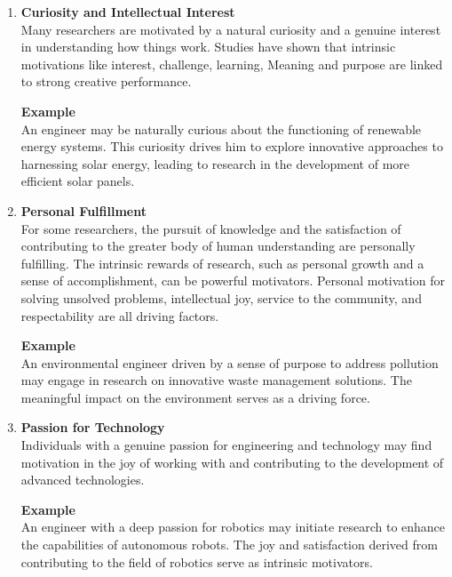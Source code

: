 \documentclass{article}
\begin{document}
	\begin{enumerate}[label=\textbf{\roman*)}]
		\item \textbf{Curiosity and Intellectual Interest} \\
		Many researchers are motivated by a natural curiosity and a genuine interest in understanding how
		things work.
		Studies have shown that intrinsic motivations like interest, challenge, learning, Meaning and purpose
		are linked to strong creative performance.

		\textbf{Example} \\
		An engineer may be naturally curious about the functioning of renewable energy systems.
		This curiosity drives him to explore innovative approaches to harnessing solar energy, leading to
		research in the development of more efficient solar panels.

		\item \textbf{Personal Fulfillment} \\
		For some researchers, the pursuit of knowledge and the satisfaction of contributing to the greater body
		of human understanding are personally fulfilling.
		The intrinsic rewards of research, such as personal growth and a sense of accomplishment, can be
		powerful motivators.
		Personal motivation for solving unsolved problems, intellectual joy, service to the community, and
		respectability are all driving factors.

		\textbf{Example} \\
		An environmental engineer driven by a sense of purpose to address pollution may engage in research on
		innovative waste management solutions.
		The meaningful impact on the environment serves as a driving force.

		\item \textbf{Passion for Technology} \\
		Individuals with a genuine passion for engineering and technology may find motivation in the joy of
		working with and contributing to the development of advanced technologies.

		\textbf{Example} \\
		An engineer with a deep passion for robotics may initiate research to enhance the capabilities of
		autonomous robots.
		The joy and satisfaction derived from contributing to the field of robotics serve as intrinsic
		motivators.
	\end{enumerate}
\end{document}
